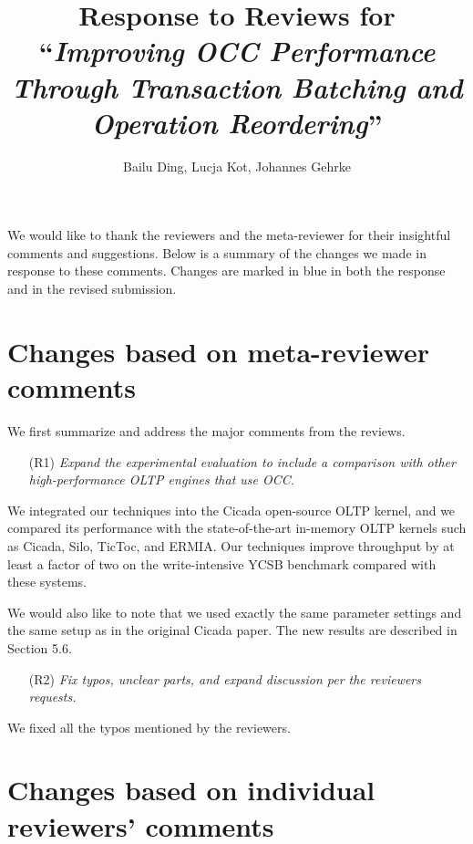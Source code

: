 \documentclass{article}
\newcommand{\changed}[1]{#1}
\newcommand{\changed}[1]{{\color{blue}#1}}
\begin{document}
\title{Response to Reviews for ``\emph{Improving OCC Performance Through Transaction Batching and Operation Reordering}''}
\author{Bailu Ding, Lucja Kot, Johannes Gehrke}
\date{}
\maketitle

We would like to thank the reviewers and the meta-reviewer for their insightful comments and suggestions. Below is a summary of the changes we made in response to these comments. Changes are marked in blue in both the response and in the revised submission.

\section{Changes based on meta-reviewer comments}

We first summarize and address the major comments from the reviews.

\begin{itemize}
	\item[(R1)] \emph{Expand the experimental evaluation to include a comparison with other high-performance OLTP engines that use OCC.}
\end{itemize}

\changed{
We integrated our techniques into the Cicada open-source OLTP kernel, and we compared its performance with the state-of-the-art in-memory OLTP kernels such as Cicada, Silo, TicToc, and ERMIA. Our techniques improve throughput by at least a factor of two on the write-intensive YCSB benchmark compared with these systems.

We would also like to note that we used exactly the same parameter settings and the same setup as in the original Cicada paper. The new results are described in Section 5.6.
}

\begin{itemize}
	\item[(R2)] \emph{Fix typos, unclear parts, and expand discussion per the reviewers requests.}
\end{itemize}

\changed{
	We fixed all the typos mentioned by the reviewers.
}

\section{Changes based on individual reviewers' comments}
\end{document}
